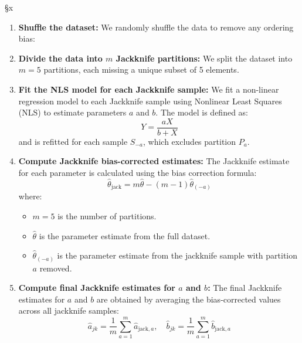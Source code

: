 §x\documentclass[]{article}
\begin{document}
\begin{enumerate}
	\item \textbf{Shuffle the dataset:} We randomly shuffle the data to remove any ordering bias:

	\item \textbf{Divide the data into $m$ Jackknife partitions:} We split the dataset into $m = 5$ partitions, each missing a unique subset of 5 elements.
	
	\item \textbf{Fit the NLS model for each Jackknife sample:} We fit a non-linear regression model to each Jackknife sample using Nonlinear Least Squares (NLS) to estimate parameters $a$ and $b$. The model is defined as:
	\begin{equation}
		Y = \frac{aX}{b+X}
	\end{equation}
	and is refitted for each sample $S_{-a}$, which excludes partition $P_a$.
	
	\item \textbf{Compute Jackknife bias-corrected estimates:} The Jackknife estimate for each parameter is calculated using the bias correction formula:
	\begin{equation}
		\hat{\theta}_{\text{jack}} = m \hat{\theta} - (m-1) \hat{\theta}_{(-a)}
	\end{equation}
	where:
	\begin{itemize}
		\item $m = 5$ is the number of partitions.
		\item $\hat{\theta}$ is the parameter estimate from the full dataset.
		\item $\hat{\theta}_{(-a)}$ is the parameter estimate from the jackknife sample with partition $a$ removed.
	\end{itemize}
	
	\item \textbf{Compute final Jackknife estimates for $a$ and $b$:} The final Jackknife estimates for $a$ and $b$ are obtained by averaging the bias-corrected values across all jackknife samples:
	\begin{equation}
		\hat{a}_{jk} = \frac{1}{m} \sum_{a=1}^{m} \hat{a}_{\text{jack}, a}, \quad
		\hat{b}_{jk} = \frac{1}{m} \sum_{a=1}^{m} \hat{b}_{\text{jack}, a}
	\end{equation}
\end{enumerate}
\end{document}
